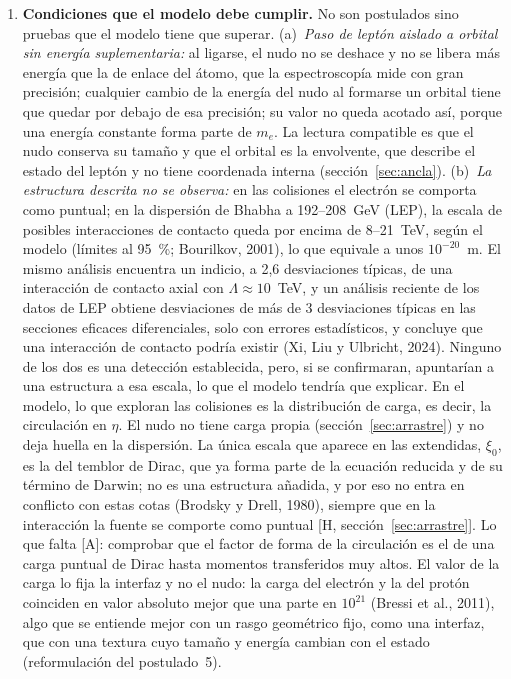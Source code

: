 \documentclass[11pt,a4paper]{article}
\newcommand{\st}[1]{\textup{[#1]}}
\begin{document}
\begin{enumerate}[label=\arabic*.,ref=\arabic*,leftmargin=*]
\item \label{ab:condiciones}\textbf{Condiciones que el modelo debe cumplir.} No son postulados sino pruebas que el modelo tiene que superar. (a)~\emph{Paso de leptón aislado a orbital sin energía suplementaria:} al ligarse, el nudo no se deshace y no se libera más energía que la de enlace del átomo, que la espectroscopía mide con gran precisión; cualquier cambio de la energía del nudo al formarse un orbital tiene que quedar por debajo de esa precisión; su valor no queda acotado así, porque una energía constante forma parte de $m_e$. La lectura compatible es que el nudo conserva su tamaño y que el orbital es la envolvente, que describe el estado del leptón y no tiene coordenada interna (sección~\ref{sec:ancla}). (b)~\emph{La estructura descrita no se observa:} en las colisiones el electrón se comporta como puntual; en la dispersión de Bhabha a 192--208~GeV (LEP), la escala de posibles interacciones de contacto queda por encima de 8--21~TeV, según el modelo (límites al 95~\%; Bourilkov, 2001), lo que equivale a unos $10^{-20}$~m. El mismo análisis encuentra un indicio, a 2,6 desviaciones típicas, de una interacción de contacto axial con $\Lambda\approx10$~TeV, y un análisis reciente de los datos de LEP obtiene desviaciones de más de 3 desviaciones típicas en las secciones eficaces diferenciales, solo con errores estadísticos, y concluye que una interacción de contacto podría existir (Xi, Liu y Ulbricht, 2024). Ninguno de los dos es una detección establecida, pero, si se confirmaran, apuntarían a una estructura a esa escala, lo que el modelo tendría que explicar. En el modelo, lo que exploran las colisiones es la distribución de carga, es decir, la circulación en $\eta$. El nudo no tiene carga propia (sección~\ref{sec:arrastre}) y no deja huella en la dispersión. La única escala que aparece en las extendidas, $\xi_0$, es la del temblor de Dirac, que ya forma parte de la ecuación reducida y de su término de Darwin; no es una estructura añadida, y por eso no entra en conflicto con estas cotas (Brodsky y Drell, 1980), siempre que en la interacción la fuente se comporte como puntual \st{H, sección~\ref{sec:arrastre}}. Lo que falta \st{A}: comprobar que el factor de forma de la circulación es el de una carga puntual de Dirac hasta momentos transferidos muy altos. El valor de la carga lo fija la interfaz y no el nudo: la carga del electrón y la del protón coinciden en valor absoluto mejor que una parte en $10^{21}$ (Bressi et al., 2011), algo que se entiende mejor con un rasgo geométrico fijo, como una interfaz, que con una textura cuyo tamaño y energía cambian con el estado (reformulación del postulado~5).


\end{enumerate}
\end{document}
